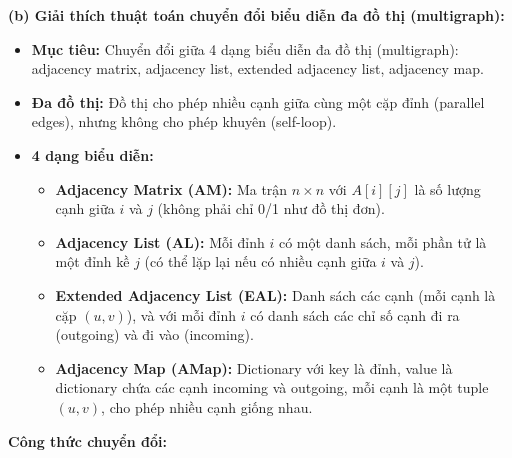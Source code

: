 \documentclass{article}
\begin{document}


\textbf{(b) Giải thích thuật toán chuyển đổi biểu diễn đa đồ thị (multigraph):}

\begin{itemize}
    \item \textbf{Mục tiêu:} Chuyển đổi giữa 4 dạng biểu diễn đa đồ thị (multigraph): adjacency matrix, adjacency list, extended adjacency list, adjacency map.
    \item \textbf{Đa đồ thị:} Đồ thị cho phép nhiều cạnh giữa cùng một cặp đỉnh (parallel edges), nhưng không cho phép khuyên (self-loop).
    \item \textbf{4 dạng biểu diễn:}
    \begin{itemize}
        \item \textbf{Adjacency Matrix (AM):} Ma trận $n \times n$ với $A[i][j]$ là số lượng cạnh giữa $i$ và $j$ (không phải chỉ 0/1 như đồ thị đơn).
        \item \textbf{Adjacency List (AL):} Mỗi đỉnh $i$ có một danh sách, mỗi phần tử là một đỉnh kề $j$ (có thể lặp lại nếu có nhiều cạnh giữa $i$ và $j$).
        \item \textbf{Extended Adjacency List (EAL):} Danh sách các cạnh (mỗi cạnh là cặp $(u,v)$), và với mỗi đỉnh $i$ có danh sách các chỉ số cạnh đi ra (outgoing) và đi vào (incoming).
        \item \textbf{Adjacency Map (AMap):} Dictionary với key là đỉnh, value là dictionary chứa các cạnh incoming và outgoing, mỗi cạnh là một tuple $(u,v)$, cho phép nhiều cạnh giống nhau.
    \end{itemize}
\end{itemize}

\textbf{Công thức chuyển đổi:}
\end{document}
